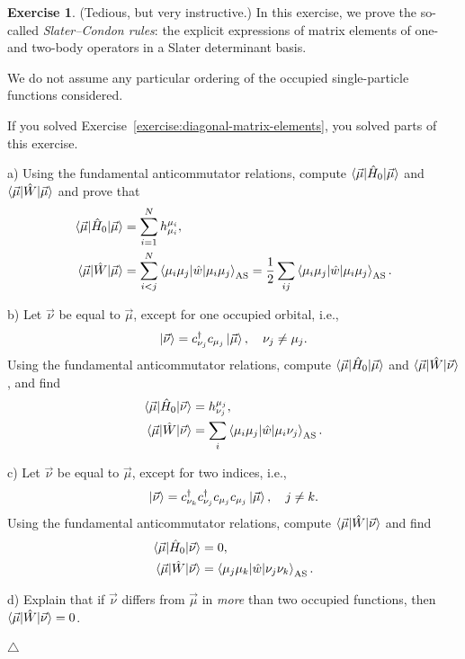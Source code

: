 \documentclass{report}
\theoremstyle{plain}
\theoremstyle{definition}
\newtheorem{exerc}{Exercise}[chapter]
\newcommand\xqed[1]{%
  \leavevmode\unskip\penalty9999 \hbox{}\nobreak\hfill
  \quad\hbox{#1}}
\newcommand\demo{\xqed{$\triangle$}}
\newenvironment{exercise}{\bigskip\begin{exerc}}{\demo\end{exerc}\bigskip}
\begin{document}
\begin{exercise}\label{exercise:slater-condon-rules}(Tedious, but very instructive.)
  In this exercise, we prove the so-called \emph{Slater--Condon rules}: the
  explicit expressions of matrix elements of one- and two-body
  operators in a Slater determinant basis.

  We do not assume any particular ordering of the occupied
  single-particle functions considered.

  If you solved Exercise~\ref{exercise:diagonal-matrix-elements}, you
  solved parts of this exercise.

  a) Using the fundamental anticommutator relations, compute
  $\braket{\vec{\mu}|\hat{H}_0|\vec{\mu}}$ and
  $\braket{\vec{\mu}|\hat{W}|\vec{\mu}}$ and prove that
  \begin{align}
    \braket{\vec{\mu}|\hat{H}_0|\vec{\mu}} &= \sum_{i=1}^N
    h^{\mu_i}_{\mu_i}, \\ \braket{\vec{\mu}|\hat{W}|\vec{\mu}} &=
    \sum_{i<j}^N \braket{\mu_i\mu_j|\hat{w}|\mu_i\mu_j}_\text{AS} =
    \frac{1}{2}\sum_{ij} \braket{\mu_i\mu_j|\hat{w}|\mu_i\mu_j}_\text{AS}.
  \end{align}
  
  b) Let $\vec{\nu}$ be equal to $\vec{\mu}$, except for one occupied orbital, i.e.,
  \begin{equation}
    \ket{\vec{\nu}} = c^\dag_{\nu_j} c_{\mu_j} \ket{\vec{\mu}}, \quad
    \nu_j \neq \mu_j.
  \end{equation}
  Using the fundamental anticommutator relations, compute $\braket{\vec{\mu}|\hat{H}_0|\vec{\mu}}$ and
  $\braket{\vec{\mu}|\hat{W}|\vec{\nu}}$, and find
  \begin{align}
    \braket{\vec{\mu}|\hat{H}_0|\vec{\nu}} &= h^{\mu_j}_{\nu_j}, \\
    \braket{\vec{\mu}|\hat{W}|\vec{\nu}} &= \sum_i \braket{\mu_i \mu_j|\hat{w}|\mu_i\nu_j}_\text{AS}.
  \end{align}
  
  c) Let $\vec{\nu}$ be equal to $\vec{\mu}$, except for two indices, i.e.,
  \begin{equation}
    \ket{\vec{\nu}} = c^\dag_{\nu_k} c^\dag_{\nu_j} c_{\mu_j}
    c_{\mu_j} \ket{\vec{\mu}}, \quad j \neq k.
  \end{equation}
  Using the fundamental anticommutator relations, compute
  $\braket{\vec{\mu}|\hat{W}|\vec{\nu}}$ and find
  \begin{align}
    \braket{\vec{\mu}|\hat{H}_0|\vec{\nu}} &= 0, \\
    \braket{\vec{\mu}|\hat{W}|\vec{\nu}} &= \braket{\mu_j \mu_k|\hat{w}|\nu_j\nu_k}_\text{AS}.
  \end{align}
  
  d) Explain that if $\vec{\nu}$ differs from $\vec{\mu}$ in
  \emph{more} than two occupied functions, then
  $\braket{\vec{\mu}|\hat{W}|\vec{\nu}} = 0$.

\end{exercise}
\end{document}
